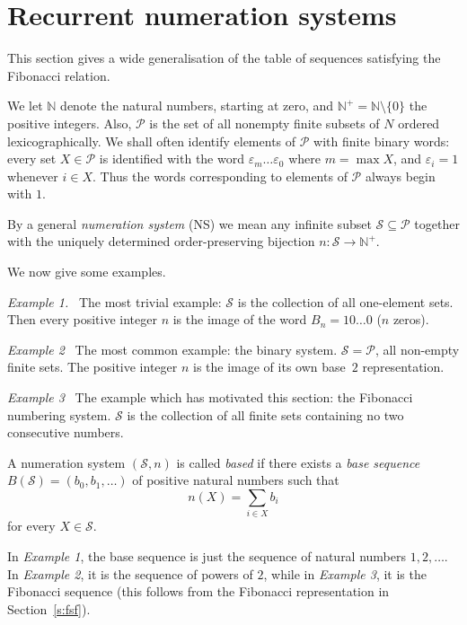 \documentclass[12pt]{article}
\newcommand{\head}[1]{\medbreak\noindent\textit{#1}\ }
\begin{document}
\section{Recurrent numeration systems}

This section gives a wide generalisation of the table of sequences
satisfying the Fibonacci relation.

\newcommand{\N}{\mathbb{N}} \newcommand{\Z}{\mathbb{Z}} 
\newcommand{\e}{\varepsilon}
We let $\N$ denote the natural numbers, starting at zero, and
$\N^+=\N\setminus\{0\}$ the positive integers. Also,
$\mathcal{P}$ is the set of all nonempty finite subsets of $N$ ordered
lexicographically. We shall often identify elements of $\mathcal{P}$ with
finite binary words: every set $X\in\mathcal{P}$ is identified with the word
$\e_m\ldots\e_0$ where $m=\max X$, and $\e_i=1$ whenever $i\in X$.
Thus the words corresponding to elements of $\mathcal{P}$ always 
begin with $1$.

By a general \emph{numeration system} (NS) we mean any infinite subset
$\mathcal{S}\subseteq\mathcal{P}$ together with the uniquely determined 
order-preserving bijection $n:\mathcal{S}\rightarrow\N^+$.

We now give some examples.

\head{Example 1.} The most trivial example: $\mathcal{S}$ is the collection of
all one-element sets. Then every
positive integer $n$ is the image of the word $B_n=10\ldots 0$ ($n$ zeros).

\head{Example 2} The most common example: the binary system.
$\mathcal{S}=\mathcal{P}$, all non-empty finite sets. The positive
integer $n$ is the image of its own base~$2$ representation.

\head{Example 3} The example which has motivated this section: the Fibonacci
numbering system. $\mathcal{S}$ is the collection of all finite sets
containing no two consecutive numbers.

\medbreak

A numeration system $(\mathcal{S},n)$ is called {\it based}
if there exists a {\it base sequence} $B(\mathcal{S})=(b_0,b_1,\ldots)$
of positive natural numbers such that
$$n(X)=\sum_{i\in X}b_i$$
for every $X\in\mathcal{S}$.

In \emph{Example 1}, the base sequence is just the sequence of natural
numbers $1,2,\ldots$. In \emph{Example 2}, it is the sequence of powers
of $2$, while in \emph{Example 3}, it is the Fibonacci sequence (this
follows from the Fibonacci representation in Section~\ref{s:fsf}).
\end{document}
